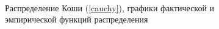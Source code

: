 \documentclass[12pt,a4paper]{article}
\begin{document}
{\begin{figure}[htp]
\begin{minipage}[h]{0.3\linewidth}
						\\
					\end{minipage}
					\caption{Распределение Коши (\ref{cauchy}), графики фактической и эмпирической функций распределения}
					\label{ris:cauchy_cum}
				\end{figure}
			}
		
\end{document}
